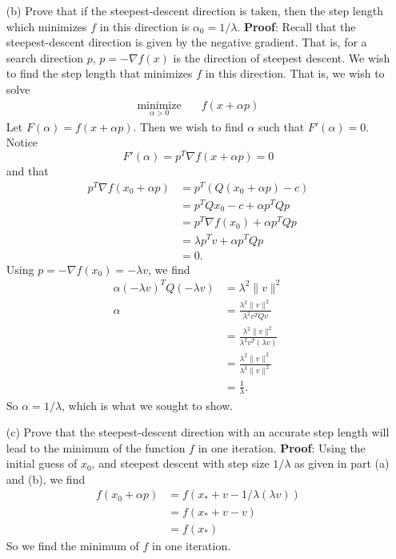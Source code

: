 \documentclass{article}
\begin{document}
\begin{itemize}
\begin{itemize}
        \item[(b)] Prove that if the steepest-descent direction is taken, then the step length which minimizes $f$ in this direction is $\alpha_0 = 1/\lambda$.
        \newline\newline
        \textbf{Proof}: Recall that the steepest-descent direction is given by the negative gradient. That is, for a search direction $p$, $p = -\nabla f(x)$ is the direction of steepest descent. We wish to find the step length that minimizes $f$ in this direction. That is, we wish to solve
        \begin{align*}
            \underset{\alpha > 0}{\text{minimize}} \hspace{1em} &f(x+\alpha p)
        \end{align*}
        Let $F(\alpha) = f(x + \alpha p)$. Then we wish to find $\alpha$ such that $F'(\alpha) = 0$. Notice
        \[F'(\alpha) = p^T\nabla f(x + \alpha p) = 0\]
        and that
        \begin{align*}
            p^T\nabla f(x_0 + \alpha p) &= p^T(Q(x_0 + \alpha p) - c)\\
            &= p^TQx_0 - c + \alpha p^TQp\\
            &= p^T\nabla f(x_0) + \alpha p^TQp\\
            &= \lambda p^Tv + \alpha p^TQp\\
            &= 0.
        \end{align*}
        Using $p = -\nabla f(x_0) = -\lambda v$, we find
        \begin{align*}
            \alpha (-\lambda v)^TQ(-\lambda v) &= \lambda^2 \|v\|^2\\
            \alpha &= \frac{\lambda^2\|v\|^2}{\lambda^2v^TQv}\\
            &= \frac{\lambda^2\|v\|^2}{\lambda^2v^T(\lambda v)}\\
            &= \frac{\lambda^2\|v\|^2}{\lambda^3\|v\|^2}\\
            &= \frac{1}{\lambda}.
        \end{align*}
        So $\alpha = 1/\lambda$, which is what we sought to show.
        \newline
        
        \item[(c)] Prove that the steepest-descent direction with an accurate step length will lead to the minimum of the function $f$ in one iteration.
        \newline\newline
        \textbf{Proof}: Using the initial guess of $x_0$, and steepest descent with step size $1/\lambda$ as given in part (a) and (b), we find
        \begin{align*}
            f(x_0 + \alpha p) &= f(x_* + v - 1/\lambda(\lambda v))\\
            &= f(x_* + v - v)\\
            &= f(x_*)
        \end{align*}
        So we find the minimum of $f$ in one iteration. 
        \newline
        

\end{itemize}
\end{itemize}
\end{document}
